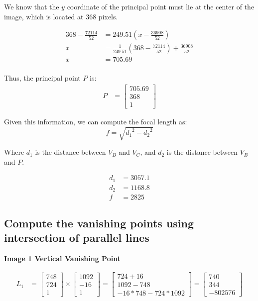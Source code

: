 \documentclass[12pt, oneside]{article}
\begin{document}
We know that the $y$ coordinate of the principal point must lie at the center 
of the image, which is located at $368$ pixels.

\begin{align*}
    368 - \frac{72114}{52} &= 249.51 (x - \frac{36908}{52})  \\
    x &=  \frac{1}{ 249.51}( 368 - \frac{72114}{52}) + \frac{36908}{52}  \\
    x &=  705.69 \\
\end{align*}

Thus, the principal point $P$ is:
\begin{align*}
    P &= \begin{bmatrix} 705.69 \\ 368 \\1 \end{bmatrix} 
\end{align*}

Given this information, we can compute the focal length as:
$$ f = \sqrt{{d_1}^2 - {d_2}^2} $$

Where $d_1$ is the distance between $V_B$ and $V_C$, and $d_2$ is the distance
between $V_B$ and $P$.

\begin{align*}
    d_1 &=  3057.1 \\
    d_2 &= 1168.8 \\ 
    f &= 2825
\end{align*}
\subsection{Compute the vanishing points using intersection of parallel lines}

\textbf{Image 1 Vertical Vanishing Point}

\begin{align*}
L_1 &=    \begin{bmatrix}
            748 \\
            724 \\
            1
        \end{bmatrix} \times 
        \begin{bmatrix}
            1092 \\
            -16 \\
            1
        \end{bmatrix}  = 
        \begin{bmatrix}
            724 + 16 \\
            1092 - 748 \\
            -16*748 - 724*1092
        \end{bmatrix} = 
        \begin{bmatrix}
            740  \\
            344 \\
            -802576 
        \end{bmatrix}                                                   
\end{align*}
\end{document}
